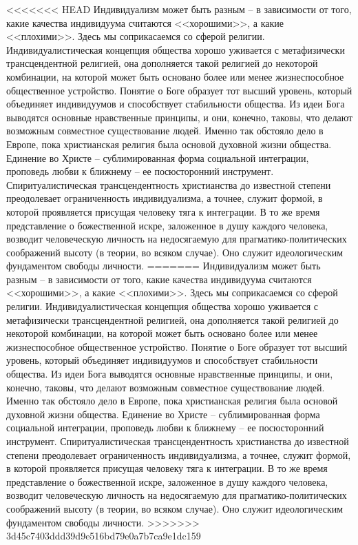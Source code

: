 \documentclass{book}
\begin{document}
<<<<<<< HEAD
Индивидуализм может быть разным -- в зависимости от то­го, какие качества индивидуума считаются <<хорошими>>, а ка­кие <<плохими>>. Здесь мы соприкасаемся со сферой религии. Индивидуалистическая концепция общества хорошо уживает­ся с метафизически трансцендентной религией, она дополняет­ся такой религией до некоторой комбинации, на которой может быть основано более или менее жизнеспособное общественное устройство. Понятие о Боге образует тот высший уровень, ко­торый объединяет индивидуумов и способствует стабильности общества. Из идеи Бога выводятся основные нравственные принципы, и они, конечно, таковы, что делают возможным совместное существование людей. Именно так обстояло дело в Европе, пока христианская религия была основой духовной жизни общества. Единение во Христе -- сублимированная форма социальной интеграции, проповедь любви к ближнему -- ее по­сюсторонний инструмент. Спиритуалистическая трансцендент­ность христианства до известной степени преодолевает ограни­ченность индивидуализма, а точнее, служит формой, в которой проявляется присущая человеку тяга к интеграции. В то же время представление о божественной искре, заложенное в ду­шу каждого человека, возводит человеческую личность на не­досягаемую для прагматико‑политических соображений высоту (в теории, во всяком случае). Оно служит идеологическим фундаментом свободы личности.
=======
Индивидуализм может быть разным -- в зависимости от то­го, какие качества индивидуума считаются <<хорошими>>, а ка­кие <<плохими>>. Здесь мы соприкасаемся со сферой религии. Индивидуалистическая концепция общества хорошо уживает­ся с метафизически трансцендентной религией, она дополняет­ся такой религией до некоторой комбинации, на которой может быть основано более или менее жизнеспособное общественное устройство. Понятие о Боге образует тот высший уровень, ко­торый объединяет индивидуумов и способствует стабильности общества. Из идеи Бога выводятся основные нравственные принципы, и они, конечно, таковы, что делают возможным совместное существование людей. Именно так обстояло дело в Европе, пока христианская религия была основой духовной жизни общества. Единение во Христе -- сублимированная форма социальной интеграции, проповедь любви к ближнему -- ее по­сюсторонний инструмент. Спиритуалистическая трансцендент­ность христианства до известной степени преодолевает ограни­ченность индивидуализма, а точнее, служит 
формой, в которой проявляется присущая человеку тяга к интеграции. В то же время представление о божественной искре, заложенное в ду­шу каждого человека, возводит человеческую личность на не­досягаемую для прагматико-политических соображений высоту (в теории, во всяком случае). Оно служит идеологическим фундаментом свободы личности.
>>>>>>> 3d45c7403ddd39d9e516bd79e0a7b7ca9e1dc159
\end{document}
